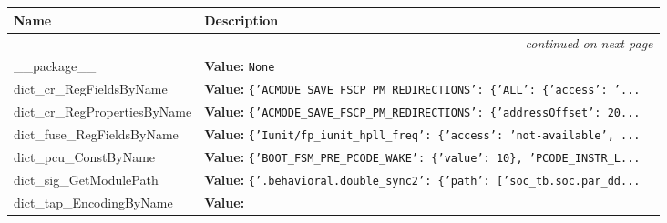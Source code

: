     \vspace{-1cm}
\hspace{\varindent}\begin{longtable}{|p{\varnamewidth}|p{\vardescrwidth}|l}
\cline{1-2}
\cline{1-2} \centering \textbf{Name} & \centering \textbf{Description}& \\
\cline{1-2}
\endhead\cline{1-2}\multicolumn{3}{r}{\small\textit{continued on next page}}\\\endfoot\cline{1-2}
\endlastfoot\raggedright \_\-\_\-p\-a\-c\-k\-a\-g\-e\-\_\-\_\- & \raggedright \textbf{Value:} 
{\tt None}&\\
\cline{1-2}
\raggedright d\-i\-c\-t\-\_\-c\-r\-\_\-R\-e\-g\-F\-i\-e\-l\-d\-s\-B\-y\-N\-a\-m\-e\- & \raggedright \textbf{Value:} 
{\tt \texttt{\{}\texttt{'}\texttt{ACMODE\_SAVE\_FSCP\_PM\_REDIRECTIONS}\texttt{'}\texttt{: }\texttt{\{}\texttt{'}\texttt{ALL}\texttt{'}\texttt{: }\texttt{\{}\texttt{'}\texttt{access}\texttt{'}\texttt{: }\texttt{'}\texttt{...}}&\\
\cline{1-2}
\raggedright d\-i\-c\-t\-\_\-c\-r\-\_\-R\-e\-g\-P\-r\-o\-p\-e\-r\-t\-i\-e\-s\-B\-y\-N\-a\-m\-e\- & \raggedright \textbf{Value:} 
{\tt \texttt{\{}\texttt{'}\texttt{ACMODE\_SAVE\_FSCP\_PM\_REDIRECTIONS}\texttt{'}\texttt{: }\texttt{\{}\texttt{'}\texttt{addressOffset}\texttt{'}\texttt{: }20\texttt{...}}&\\
\cline{1-2}
\raggedright d\-i\-c\-t\-\_\-f\-u\-s\-e\-\_\-R\-e\-g\-F\-i\-e\-l\-d\-s\-B\-y\-N\-a\-m\-e\- & \raggedright \textbf{Value:} 
{\tt \texttt{\{}\texttt{'}\texttt{Iunit/fp\_iunit\_hpll\_freq}\texttt{'}\texttt{: }\texttt{\{}\texttt{'}\texttt{access}\texttt{'}\texttt{: }\texttt{'}\texttt{not-available}\texttt{'}\texttt{, }\texttt{...}}&\\
\cline{1-2}
\raggedright d\-i\-c\-t\-\_\-p\-c\-u\-\_\-C\-o\-n\-s\-t\-B\-y\-N\-a\-m\-e\- & \raggedright \textbf{Value:} 
{\tt \texttt{\{}\texttt{'}\texttt{BOOT\_FSM\_PRE\_PCODE\_WAKE}\texttt{'}\texttt{: }\texttt{\{}\texttt{'}\texttt{value}\texttt{'}\texttt{: }10\texttt{\}}\texttt{, }\texttt{'}\texttt{PCODE\_INSTR\_L}\texttt{...}}&\\
\cline{1-2}
\raggedright d\-i\-c\-t\-\_\-s\-i\-g\-\_\-G\-e\-t\-M\-o\-d\-u\-l\-e\-P\-a\-t\-h\- & \raggedright \textbf{Value:} 
{\tt \texttt{\{}\texttt{'}\texttt{.behavioral.double\_sync2}\texttt{'}\texttt{: }\texttt{\{}\texttt{'}\texttt{path}\texttt{'}\texttt{: }\texttt{[}\texttt{'}\texttt{soc\_tb.soc.par\_dd}\texttt{...}}&\\
\cline{1-2}
\raggedright d\-i\-c\-t\-\_\-t\-a\-p\-\_\-E\-n\-c\-o\-d\-i\-n\-g\-B\-y\-N\-a\-m\-e\- & \raggedright \textbf{Value:} 

\end{longtable}
